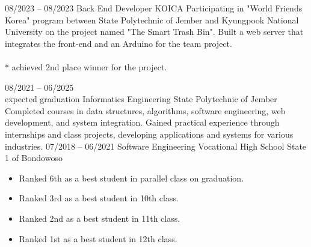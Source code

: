 \documentclass[9pt]{developercv} %
\begin{document}
\vspace{-10 pt}
\begin{entrylist}
	\entry
	{08/2023 -- 08/2023}
	{Back End Developer}
	{KOICA}
	{Participating in "World Friends Korea" program between State Polytechnic of Jember and Kyungpook National University on the project named "The Smart Trash Bin". Built a web server that integrates the front-end and an Arduino for the team project.
	\vspace{-7 pt}
	\\ \\
	{* achieved 2nd place winner for the project.}
	}
\end{entrylist}


\vspace{-10 pt}
\begin{entrylist}
	\entry
	{08/2021 -- 06/2025 \\\footnotesize{expected graduation}}
	{Informatics Engineering}
	{State Polytechnic of Jember}
	{Completed courses in data structures, algorithms, software engineering, web development, and system integration. Gained practical experience through internships and class projects, developing applications and systems for various industries.}
	\entry
	{07/2018 -- 06/2021}
	{Software Engineering}
	{Vocational High School State 1 of Bondowoso}
	{\vspace{-10pt}
		\begin{itemize}[noitemsep,topsep=0pt,parsep=0pt,partopsep=0pt, leftmargin=-1pt]
			\item Ranked 6th as a best student in parallel class on graduation.
			\item Ranked 3rd as a best student in 10th class.
			\item Ranked 2nd as a best student in 11th class.
			\item Ranked 1st as a best student in 12th class.
		\end{itemize}
	}
\end{entrylist}
\end{document}
